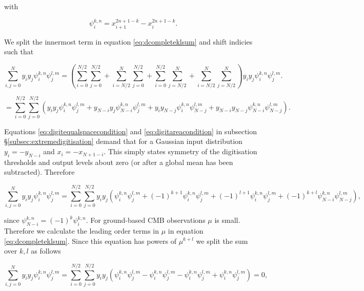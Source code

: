 \documentclass[apj]{emulateapj}
\begin{document}
with

\begin{equation}
\psi_i^{k,n} = x_{i+1}^{2n+1-k} - x_{i}^{2n+1-k}.
\end{equation}

We split the innermost term in equation \ref{eq:dcompleteklsum} and shift indicies such that

\begin{equation}
\sum_{i,j = 0}^N y_i y_j \psi_i^{k, n} \psi_j^{l, m} = \left( \sum_{i = 0}^{N/2}\sum_{j = 0}^{N/2} + \sum_{i = N/2}^{N}\sum_{j = 0}^{N/2} + \sum_{i = 0}^{N/2}\sum_{j = N/2}^{N} + \sum_{i = N/2}^{N}\sum_{j = N/2}^{N} \right) y_i y_j \psi_i^{k, n} \psi_j^{l, m}.
\end{equation}

\begin{equation}
= \sum_{i = 0}^{N/2}\sum_{j = 0}^{N/2} \left( y_i y_j \psi_i^{k, n} \psi_j^{l, m} +  y_{N-i} y_j \psi_{N-i}^{k, n} \psi_j^{l, m} + y_i y_{N-j} \psi_i^{k, n} \psi_{N-j}^{l, m} + y_{N-i} y_{N-j} \psi_{N-i}^{k, n} \psi_{N-j}^{l, m} \right).
\end{equation}

Equations \ref{eq:digitequalspacecondition} and \ref{eq:digitareacondition} in subsection \S\ref{subsec:extremedigitisation} demand that for a Gaussian input distribution $y_i = -y_{N-i}$ and $x_i = -x_{N+1-i}$. This simply states symmetry of the digitisation thresholds and output levels about zero (or after a global mean has been subtracted). Therefore

\begin{equation} \label{eq:ijsumpsiflip}
\sum_{i,j = 0}^N y_i y_j \psi_i^{k, n} \psi_j^{l, m} = \sum_{i = 0}^{N/2}\sum_{j = 0}^{N/2} y_i y_j \left( \psi_i^{k, n} \psi_j^{l, m} + (-1)^{k+1} \psi_{i}^{k, n} \psi_j^{l, m} + (-1)^{l+1} \psi_i^{k, n} \psi_{j}^{l, m} + (-1)^{k+l} \psi_{N-i}^{k, n} \psi_{N-j}^{l, m} \right),
\end{equation}

since $\psi_{N-i}^{k,n} = (-1)^{k} \psi_{i}^{k,n}$.  For ground-based CMB observations $\mu$ is small. Therefore we calculate the leading order terms in $\mu$ in equation \ref{eq:dcompleteklsum}. Since this equation has powers of $\mu^{k+l}$ we split the sum over $k, l$ as follows

\begin{equation}
\sum_{i,j = 0}^N y_i y_j \psi_i^{k, n} \psi_j^{l, m} = \sum_{i = 0}^{N/2}\sum_{j = 0}^{N/2} y_i y_j  \left( \psi_i^{k, n} \psi_j^{l, m} - \psi_{i}^{k, n} \psi_j^{l, m} - \psi_i^{k, n} \psi_{j}^{l, m} + \psi_{i}^{k, n} \psi_{j}^{l, m} \right) = 0,
\end{equation}
\end{document}
